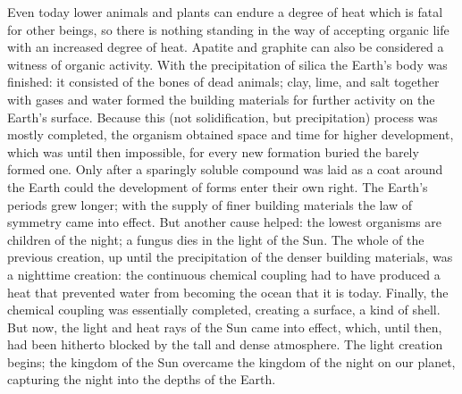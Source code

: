 \documentclass[a4paper, 12pt, oneside]{article}
\begin{document}
Even today lower animals and plants can endure a degree of heat which is fatal for other beings, so there is nothing standing in the way of accepting organic life with an increased degree of heat. Apatite and graphite can also be considered a witness of organic activity. With the precipitation of silica the Earth's body was finished: it consisted of the bones of dead animals; clay, lime, and salt together with gases and water formed the building materials for further activity on the Earth's surface. Because this (not solidification, but precipitation) process was mostly completed, the organism obtained space and time for higher development, which was until then impossible, for every new formation buried the barely formed one. Only after a sparingly soluble compound was laid as a coat around the Earth could the development of forms enter their own right. The Earth's periods grew longer; with the supply of finer building materials the law of symmetry came into effect. But another cause helped: the lowest organisms are children of the night; a fungus dies in the light of the Sun. The whole of the previous creation, up until the precipitation of the denser building materials, was a nighttime creation: the continuous chemical coupling had to have produced a heat that prevented water from becoming the ocean that it is today. Finally, the chemical coupling was essentially completed, creating a surface, a kind of shell. But now, the light and heat rays of the Sun came into effect, which, until then, had been hitherto blocked by the tall and dense atmosphere. The light creation begins; the kingdom of the Sun overcame the kingdom of the night on our planet, capturing the night into the depths of the Earth.
\end{document}
